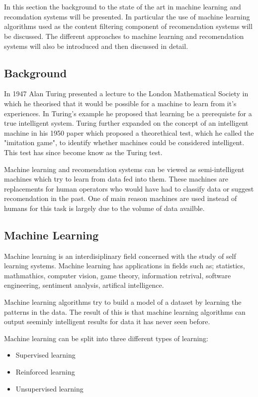 \chapter{}

In this section the background to the state of the art in machine learning and recomdation systems will be presented.
In particular the use of machine learning algorithms used as the content filtering component of recomendation systems will be discussed.
The different approaches to machine learning and recomendation systems will also be introduced and then discussed in detail.

\section{Background}
In 1947 Alan Turing presented a lecture to the London Mathematical Society in which he theorised that it would be possible for a machine to learn from it's experiences.
In Turing's example he proposed that learning be a prerequiste for a true intelligent system.
Turing further expanded on the concept of an intelligent machine in his 1950 paper which proposed a theorethical test, which he called the "imitation game", to identify whether machines could be considered intelligent.
This test has since become know as the Turing test.

Machine learning and recomendation systems can be viewed as semi-intelligent machines which try to learn from data fed into them.
These machines are replacements for human operators who would have had to classify data or suggest recomendation in the past.
One of main reason machines are used instead of humans for this task is largely due to the volume of data availble.

\section{Machine Learning}
Machine learning is an interdisiplinary field concerned with the study of self learning systems.
Machine learning has applications in fields such as; statistics, mathmathics, computer vision, game theory, information retrival, software engineering, sentiment analysis, artifical intelligence.

Machine learning algorithms try to build a model of a dataset by learning the patterns in the data.
The result of this is that machine learning algorithms can output seeminly intelligent results for data it has never seen before.

Machine learning can be split into three different types of learning:
\begin{itemize}
    \item Supervised learning
    \item Reinforced learning
    \item Unsupervised learning
\end{itemize}

